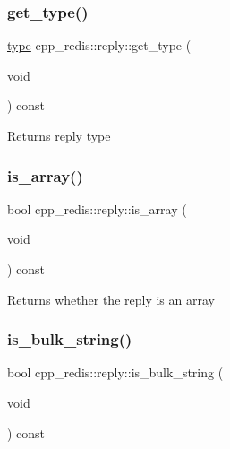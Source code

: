 \subsubsection{\texorpdfstring{get\+\_\+type()}{get\_type()}}
{\footnotesize\ttfamily \hyperlink{classcpp__redis_1_1reply_acc272b2a52164cac1d110c619a0b25bd}{type} cpp\+\_\+redis\+::reply\+::get\+\_\+type (\begin{DoxyParamCaption}\item[{void}]{ }\end{DoxyParamCaption}) const}

\begin{DoxyReturn}{Returns}
reply type 
\end{DoxyReturn}
\mbox{\label{classcpp__redis_1_1reply_a3a94881a46125d281cb36191c4b7d19a}} 
\subsubsection{\texorpdfstring{is\+\_\+array()}{is\_array()}}
{\footnotesize\ttfamily bool cpp\+\_\+redis\+::reply\+::is\+\_\+array (\begin{DoxyParamCaption}\item[{void}]{ }\end{DoxyParamCaption}) const}

\begin{DoxyReturn}{Returns}
whether the reply is an array 
\end{DoxyReturn}
\mbox{\label{classcpp__redis_1_1reply_ab1f4e57a33fb438ab165a65f2d31ca8d}} 
\subsubsection{\texorpdfstring{is\+\_\+bulk\+\_\+string()}{is\_bulk\_string()}}
{\footnotesize\ttfamily bool cpp\+\_\+redis\+::reply\+::is\+\_\+bulk\+\_\+string (\begin{DoxyParamCaption}\item[{void}]{ }\end{DoxyParamCaption}) const}

